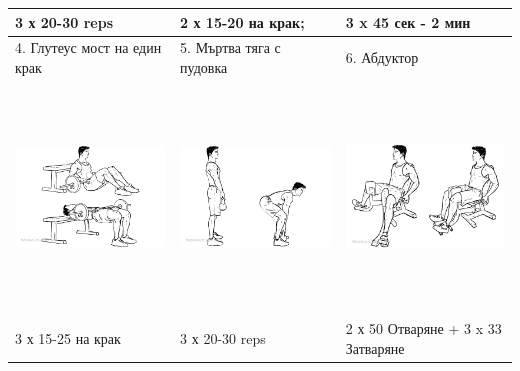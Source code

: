 \documentclass{article}
\begin{document}
\begin{tabular}{ | m{5cm} | m{5cm} | m{5cm} | }
3 х 20-30 reps & 2 х 15-20 на крак; & 3 x 45 сек - 2 мин \\
\hline
4. Глутеус мост на един крак & 5. Мъртва тяга с пудовка & 6. Абдуктор \\ 
\begin{minipage}{5cm} \includegraphics[width=\linewidth, height=60mm]{Barbell_Hip_Thrusts.png} \end{minipage} & 
\begin{minipage}{5cm} \includegraphics[width=\linewidth, height=60mm]{Kettlebell_Deadlifts.png} \end{minipage} &
\begin{minipage}{5cm} \includegraphics[width=\linewidth, height=60mm]{Adductor.png} \end{minipage} \\
3 х 15-25 на крак &  3 х 20-30 reps & 2 х 50 Отваряне + 3 x 33 Затваряне  \\ 
\hline
\end{tabular}
\end{document}
